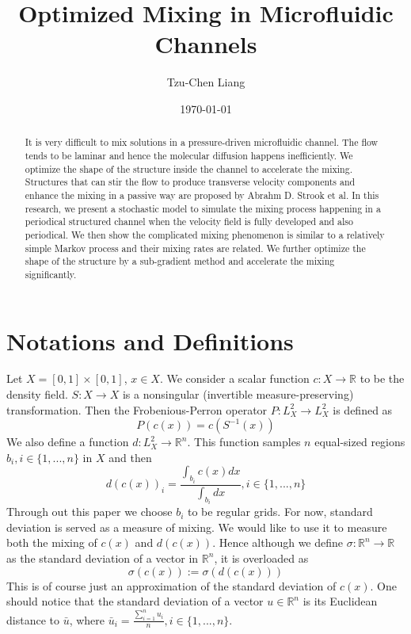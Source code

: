 \documentclass{article}
\title{Optimized Mixing in Microfluidic Channels}
\author{Tzu-Chen Liang}
\date{\today}
\begin{document}
\maketitle

\begin{abstract}

It is very difficult to mix solutions in a pressure-driven microfluidic channel. The flow tends to be laminar and hence the molecular diffusion happens inefficiently. We optimize the shape of the structure inside the channel to accelerate the mixing. Structures that can stir the flow to produce transverse velocity components and enhance the mixing in a passive way are proposed by Abrahm D. Strook et al. In this research, we present a stochastic model to simulate the mixing process happening in a periodical structured channel when the velocity field is fully developed and also periodical. We then show  the complicated mixing phenomenon is similar to a relatively simple Markov process and their mixing rates are related. We further optimize the shape of the structure by a sub-gradient method and accelerate the mixing significantly.




\end{abstract}





\section{Notations and Definitions}
Let $X =[0,1]\times[0,1]$, $x\in X$. We consider a scalar function $c:X \rightarrow \mathbb{R}$ to be the density field. $S:X\rightarrow X$ is a nonsingular (invertible measure-preserving) transformation. Then the Frobenious-Perron operator $P:L_{X}^2\rightarrow L_{X}^2$ is defined as
$$ P(c(x))=c(S^{-1}(x)) $$   
We also define a function $d:L_{X}^2 \rightarrow \mathbb{R}^n$. This function samples $n$ equal-sized regions $b_i,i\in \{1,...,n\}$ in $X$ and then
$$ d(c(x))_i = \frac{\int_{b_i}c(x)dx}{\int_{b_i}dx},i\in \{1,...,n\} $$
Through out this paper we choose $b_i$ to be regular grids.
For now, standard deviation is served as a measure of mixing. We would like to use it to measure both the mixing of $c(x)$ and $d(c(x))$. Hence although we define $\sigma: \mathbb{R}^n \rightarrow \mathbb{R}$ as the standard deviation of a vector in $\mathbb{R}^n$, it is overloaded as
$$ \sigma(c(x)) := \sigma(d(c(x))) $$
This is of course just an approximation of the standard deviation of $c(x)$. One should notice that the standard deviation of a vector $ u \in \mathbb{R}^n$ is its Euclidean distance to $\bar{u}$, where $\bar{u}_i = \frac{\sum_{i=1}^{n}u_i}{n} ,i\in \{1,...,n\}$. 
\end{document}
